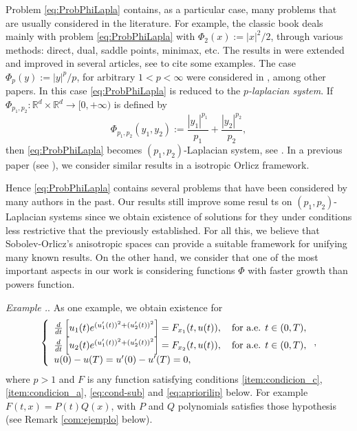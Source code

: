 \documentclass[twoside]{article}
\theoremstyle{remark}
\newcounter{example}[section]
\newenvironment{example}{\refstepcounter{example}\noindent\textit{Example \arabic{section}.\arabic{example}}.}{ }
\newcommand{\rr}{\mathbb{R}}
\begin{document}
  Problem \eqref{eq:ProbPhiLapla} contains, as a particular case, many problems that are usually considered in the literature.  For example, the classic book  \cite{mawhin2010critical} deals mainly with problem \eqref{eq:ProbPhiLapla} with $\Phi_2(x):=|x|^2/2$, through various methods: direct, dual, saddle points,  minimax, etc. The results in \cite{mawhin2010critical} were extended and improved in several articles,  see  \cite{tang1998periodic,tang2001periodic,tang1995periodic,wu1999periodic,zhao2004periodic}  to cite some examples. The case $\Phi_p(y):=|y|^p/p$, for arbitrary $1<p<\infty$ were considered in  \cite{tang2010periodic,Tian2007192}, among other papers. In this case \eqref{eq:ProbPhiLapla} is reduced to the \emph{$p$-laplacian system}.  If $\Phi_{p_1,p_2}:\rr^d\times \rr^d\to [0,+\infty)$  is defined by
\begin{equation}\label{eq:phip_1p_2}\Phi_{p_1,p_2}(y_1,y_2):=\frac{|y_1|^{p_1}}{p_1}+\frac{|y_2|^{p_2}}{p_2},\end{equation}
then \eqref{eq:ProbPhiLapla} becomes  $(p_1,p_2)$-Laplacian system, see
\cite{li2014periodic,pasca2010periodic,pacsca2010some,pasca2011some,pasca2016periodic,yang2012periodic,yang2013existence}.  In a previous paper (see \cite{ABGMS2015}), we consider similar results in a isotropic Orlicz framework.


Hence \eqref{eq:ProbPhiLapla}  contains several problems that have been considered by many authors in the past. Our results still improve some resul ts on $(p_1,p_2)$-Laplacian systems since we obtain existence  of solutions for they under conditions less restrictive that the previously established.   
For all this, we believe that Sobolev-Orlicz's anisotropic spaces can provide a suitable framework for unifying many known results. On the other hand, we consider that one of the most important aspects in our work  is considering functions $\Phi$  with  faster growth than powers function. 

\begin{example} As one example, we obtain existence for 
\begin{equation}\label{eq:RandExample}
    \left\{%
\begin{array}{ll}
  \frac{d}{dt} \left[u_1(t)e^{(u_1'(t))^2+(u_2'(t))^2}\right]= F_{x_1}(t,u(t)), \quad \hbox{for a.e. } t \in (0,T),\\
   \frac{d}{dt} \left[u_2(t)e^{(u_1'(t))^2+(u_2'(t))^2}\right]= F_{x_2}(t,u(t)), \quad \hbox{for a.e. } t \in (0,T),\\
    u(0)-u(T)=u'(0)-u'(T)=0,
\end{array}%
\right. ,
\end{equation}
where $p>1$ and $F$ is any function satisfying conditions \ref{item:condicion_c}, \ref{item:condicion_a}, \eqref{eq:cond-sub} and \eqref{eq:apriorilip} below. For example  $F(t,x)=P(t)Q(x)$, with $P$ and $Q$ polynomials satisfies those hypothesis (see Remark \ref{com:ejemplo} below).
\end{example}
\end{document}

